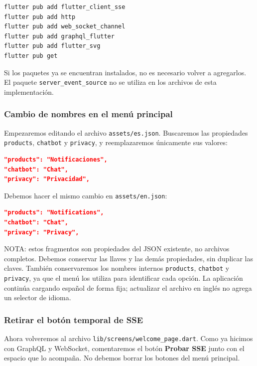 \begin{lstlisting}[language=bash, caption={Dependencias utilizadas en las nuevas ventanas}]
flutter pub add flutter_client_sse
flutter pub add http
flutter pub add web_socket_channel
flutter pub add graphql_flutter
flutter pub add flutter_svg
flutter pub get
\end{lstlisting}

Si los paquetes ya se encuentran instalados, no es necesario volver a agregarlos. El paquete \texttt{server\_event\_source} no se utiliza en los archivos de esta implementación.

\subsubsection{Cambio de nombres en el menú principal}
Empezaremos editando el archivo \texttt{assets/es.json}. Buscaremos las propiedades \texttt{products}, \texttt{chatbot} y \texttt{privacy}, y reemplazaremos únicamente sus valores:

\begin{lstlisting}[language=json, caption={Nuevos nombres en assets/es.json}]
"products": "Notificaciones",
"chatbot": "Chat",
"privacy": "Privacidad",
\end{lstlisting}

Debemos hacer el mismo cambio en \texttt{assets/en.json}:

\begin{lstlisting}[language=json, caption={Nuevos nombres en assets/en.json}]
"products": "Notifications",
"chatbot": "Chat",
"privacy": "Privacy",
\end{lstlisting}

NOTA: estos fragmentos son propiedades del JSON existente, no archivos completos. Debemos conservar las llaves y las demás propiedades, sin duplicar las claves. También conservaremos los nombres internos \texttt{products}, \texttt{chatbot} y \texttt{privacy}, ya que el menú los utiliza para identificar cada opción. La aplicación continúa cargando español de forma fija; actualizar el archivo en inglés no agrega un selector de idioma.

\subsubsection{Retirar el botón temporal de SSE}
Ahora volveremos al archivo \texttt{lib/screens/welcome\_page.dart}. Como ya hicimos con GraphQL y WebSocket, comentaremos el botón \textbf{Probar SSE} junto con el espacio que lo acompaña. No debemos borrar los botones del menú principal.

